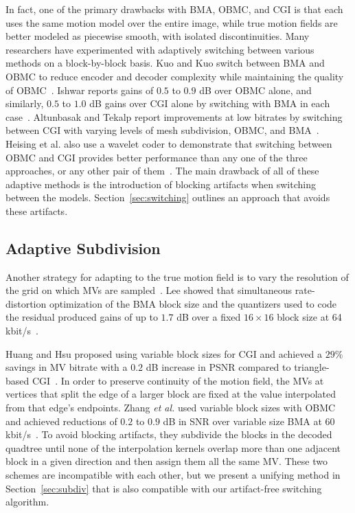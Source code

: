 \documentclass[11pt,letterpaper]{article}
\begin{document}
In fact, one of the primary drawbacks with BMA, OBMC, and CGI is that each uses
 the same motion model over the entire image, while true motion fields are
 better modeled as piecewise smooth, with isolated discontinuities.
Many researchers have experimented with adaptively switching between various
 methods on a block-by-block basis.
Kuo and Kuo switch between BMA and OBMC to reduce encoder and decoder
 complexity while maintaining the quality of OBMC~\cite{KK97}.
Ishwar reports gains of $0.5$ to $0.9$ dB over OBMC alone, and similarly,
 $0.5$ to $1.0$ dB gains over CGI alone by switching with BMA in each
 case~\cite{Ish98}.
Altunbasak and Tekalp report improvements at low bitrates by switching between
 CGI with varying levels of mesh subdivision, OBMC, and BMA~\cite{AT98}.
Heising et al. also use a wavelet coder to demonstrate that switching between
 OBMC and CGI provides better performance than any one of the three approaches,
 or any other pair of them~\cite{HMCP01}.
The main drawback of all of these adaptive methods is the introduction of
 blocking artifacts when switching between the models.
Section~\ref{sec:switching} outlines an approach that avoids these artifacts.

\subsection{Adaptive Subdivision}

Another strategy for adapting to the true motion field is to vary the
 resolution of the grid on which MVs are sampled~\cite{CYC90}.
Lee showed that simultaneous rate-distortion optimization of the BMA block size
 and the quantizers used to code the residual produced gains of up to $1.7$ dB
 over a fixed $16\times 16$ block size at 64 kbit/s~\cite{Lee95}.

Huang and Hsu proposed using variable block sizes for CGI and achieved a
 $29\%$ savings in MV bitrate with a $0.2$ dB increase in PSNR compared to
 triangle-based CGI~\cite{HH94}.
In order to preserve continuity of the motion field, the MVs at vertices that
 split the edge of a larger block are fixed at the value interpolated from that
 edge's endpoints.
Zhang \textit{et al.} used variable block sizes with OBMC and achieved
 reductions of $0.2$ to $0.9$ dB in SNR over variable size BMA at 60
 kbit/s~\cite{ZAS98}.
To avoid blocking artifacts, they subdivide the blocks in the decoded quadtree
 until none of the interpolation kernels overlap more than one adjacent block
 in a given direction and then assign them all the same MV.
These two schemes are incompatible with each other, but we present a unifying
 method in Section~\ref{sec:subdiv} that is also compatible with our
 artifact-free switching algorithm.
\end{document}
